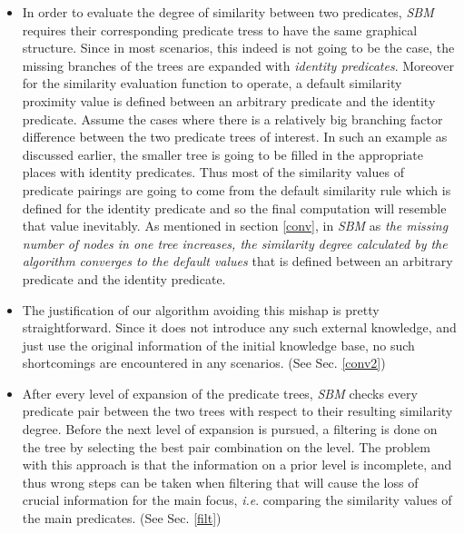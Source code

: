\documentclass[egilmezThesis.tex]{subfiles}
\begin{document}
\renewcommand{\labelitemi}{$\bullet$}
\begin{itemize}
\item  In order to evaluate the degree of similarity between two predicates, \textit{SBM} requires their corresponding predicate tress to have the same graphical structure. Since in most scenarios, this indeed is not going to be the case, the missing branches of the trees are expanded with \textit{identity predicates}. Moreover for the similarity evaluation function to operate, a default similarity proximity value is defined between an arbitrary predicate and the identity predicate. Assume the cases where there is a relatively big branching factor difference between the two predicate trees of interest. In such an example as discussed earlier, the smaller tree is going to be filled in the appropriate places with identity predicates. Thus most of the similarity values of predicate pairings are going to come from the default similarity rule which is defined for the identity predicate and so the final computation will resemble that value inevitably. As mentioned in section \ref{conv}, in \textit{SBM} as \textit{the missing number of nodes in one tree increases,  the similarity degree calculated by the algorithm converges to the default values} that is defined between an arbitrary predicate and the identity predicate.
\end{itemize}
\renewcommand{\labelitemi}{$\diamond$}
\begin{itemize}
\item The justification of our algorithm avoiding this mishap is pretty straightforward.  Since it does not introduce any such external knowledge, and just use the original information of the initial knowledge base, no such shortcomings are encountered in any scenarios. (See Sec. \ref{conv2})
\end{itemize}
\renewcommand{\labelitemi}{$\bullet$}
\begin{itemize}
\item After every level of expansion of the predicate trees, \textit{SBM} checks every predicate pair between the two trees with respect to their resulting similarity degree. Before the next level of expansion is pursued, a filtering is done on the tree by selecting the best pair combination on the level. The problem with this approach is that the information on a prior level is incomplete, and thus wrong steps can be taken when filtering that will cause the loss of crucial information for the main focus, \textit{i.e}. comparing the similarity values of the main predicates. (See Sec. \ref{filt})
\end{itemize}
\end{document}
